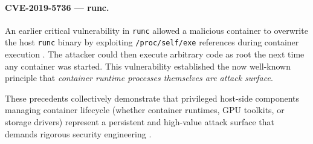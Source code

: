 \paragraph{CVE-2019-5736 — runc.} An earlier critical vulnerability in \texttt{runc} allowed a malicious container to overwrite the host \texttt{runc} binary by exploiting \texttt{/proc/self/exe} references during container execution \cite{nvd_cve_2019_5736}. The attacker could then execute arbitrary code as root the next time any container was started. This vulnerability established the now well-known principle that \textit{container runtime processes themselves are attack surface}.

These precedents collectively demonstrate that privileged host-side components managing container lifecycle (whether container runtimes, GPU toolkits, or storage drivers) represent a persistent and high-value attack surface that demands rigorous security engineering \cite{sultan2019container} \cite{lin2018measurement}.
